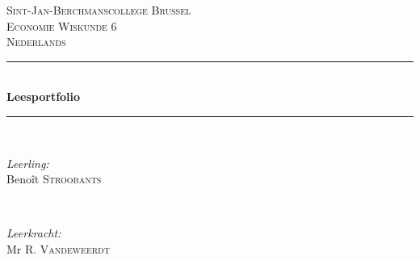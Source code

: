 \begin{titlepage}

\newcommand{\HRule}{\rule{\linewidth}{0.5mm}} %

\center %
 

\textsc{\LARGE Sint-Jan-Berchmanscollege Brussel}\\[1.5cm] %
\textsc{\Large Economie Wiskunde 6}\\[0.5cm] %
\textsc{\large Nederlands}\\[0.5cm] %


\HRule \\[0.4cm]
{ \huge \bfseries Leesportfolio}\\[0.4cm] %
\HRule \\[1.5cm]
 

\begin{minipage}{0.4\textwidth}
\begin{flushleft} \large
\emph{Leerling:}\\
Benoît \textsc{Stroobants} %
\end{flushleft}
\end{minipage}
~
\begin{minipage}{0.4\textwidth}
\begin{flushright} \large
\emph{Leerkracht:} \\
Mr R. \textsc{Vandeweerdt} %
\end{flushright}
\end{minipage}\\[2cm]



\end{titlepage}
